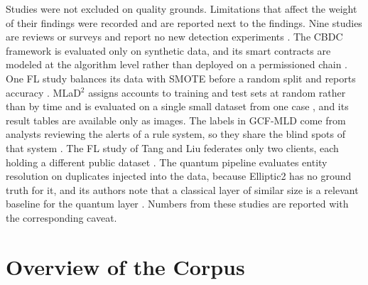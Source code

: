 \documentclass[journal]{IEEEtran}
\begin{document}
Studies were not excluded on quality grounds. Limitations that affect the weight of their findings were recorded and are reported next to the findings. Nine studies are reviews or surveys and report no new detection experiments \cite{raj2024ai,tiwari2025tbml,li2021befl,dudczyk2024supply,kapadiya2022health,ahmed2024bcfl,ural2023bcml,chen2024finance,jensen2023fighting}. The CBDC framework is evaluated only on synthetic data, and its smart contracts are modeled at the algorithm level rather than deployed on a permissioned chain \cite{amber2026cbdc}. One FL study balances its data with SMOTE before a random split and reports accuracy \cite{awosika2024xai}. MLaD$^2$ assigns accounts to training and test sets at random rather than by time and is evaluated on a single small dataset from one case \cite{luo2024mlad}, and its result tables are available only as images. The labels in GCF-MLD come from analysts reviewing the alerts of a rule system, so they share the blind spots of that system \cite{irshad2024gcfmld}. The FL study of Tang and Liu federates only two clients, each holding a different public dataset \cite{tang2024sdt}. The quantum pipeline evaluates entity resolution on duplicates injected into the data, because Elliptic2 has no ground truth for it, and its authors note that a classical layer of similar size is a relevant baseline for the quantum layer \cite{nayak2026quantum}. Numbers from these studies are reported with the corresponding caveat.

\section{Overview of the Corpus}
\label{sec:corpus}
\end{document}
